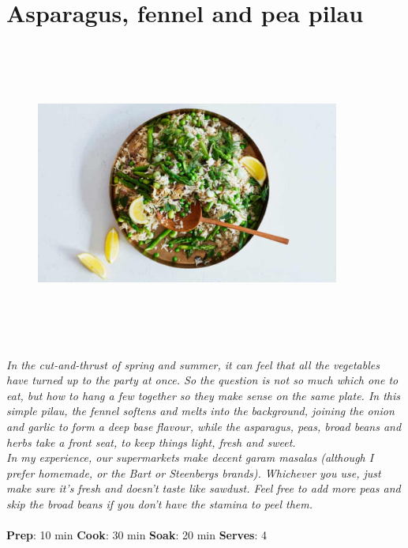 \documentclass{book}
\begin{document}
\section{Asparagus, fennel and pea pilau}
\begin{figure}
\centering\includegraphics[width=10cm,height=10cm,keepaspectratio]{Recipe_Pictures/Asparagus,_fennel_and_pea_pilau.png}
\end{figure}
\emph{In the cut-and-thrust of spring and summer, it can feel that all the vegetables have turned up to the party at once. So the question is not so much which one to eat, but how to hang a few together so they make sense on the same plate. In this simple pilau, the fennel softens and melts into the background, joining the onion and garlic to form a deep base flavour, while the asparagus, peas, broad beans and herbs take a front seat, to keep things light, fresh and sweet.\\ 
In my experience, our supermarkets make decent garam masalas (although I prefer homemade, or the Bart or Steenbergs brands). Whichever you use, just make sure it’s fresh and doesn’t taste like sawdust. Feel free to add more peas and skip the broad beans if you don’t have the stamina to peel them.}\\\\ 
\textbf{Prep}: 10 min
\textbf{Cook}: 30 min
\textbf{Soak}: 20 min
\textbf{Serves}: 4
\end{document}
